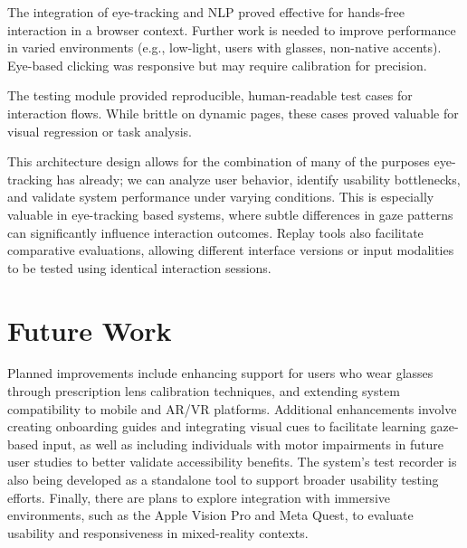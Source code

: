 The integration of eye-tracking and NLP proved effective for hands-free interaction in a browser context. Further work is needed to improve performance in varied environments (e.g., low-light, users with glasses, non-native accents). Eye-based clicking was responsive but may require calibration for precision.

The testing module provided reproducible, human-readable test cases for interaction flows. While brittle on dynamic pages, these cases proved valuable for visual regression or task analysis. 

This architecture design allows for the combination of many of the purposes eye-tracking has already; we can analyze user behavior, identify usability bottlenecks, and validate system performance under varying conditions. This is especially valuable in eye-tracking based systems, where subtle differences in gaze patterns can significantly influence interaction outcomes. Replay tools also facilitate comparative evaluations, allowing different interface versions or input modalities to be tested using identical interaction sessions.


\section{Future Work}

Planned improvements include enhancing support for users who wear glasses through prescription lens calibration techniques, and extending system compatibility to mobile and AR/VR platforms. Additional enhancements involve creating onboarding guides and integrating visual cues to facilitate learning gaze-based input, as well as including individuals with motor impairments in future user studies to better validate accessibility benefits. The system's test recorder is also being developed as a standalone tool to support broader usability testing efforts. Finally, there are plans to explore integration with immersive environments, such as the Apple Vision Pro and Meta Quest, to evaluate usability and responsiveness in mixed-reality contexts.
